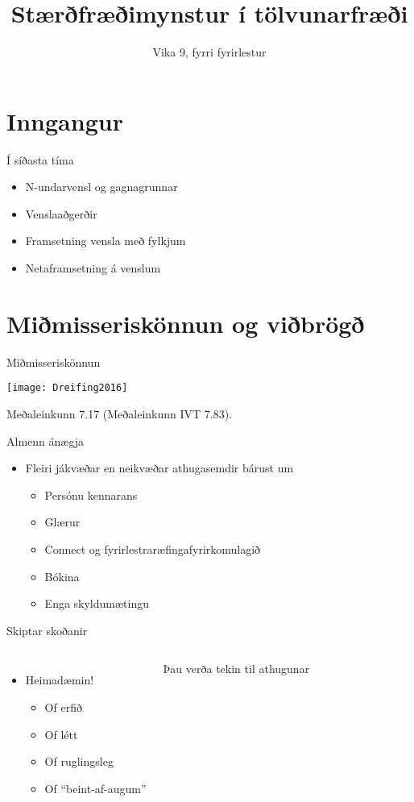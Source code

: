 \documentclass[handout]{beamer}
\title{Stærðfræðimynstur í tölvunarfræði}
\subtitle{Vika 9, fyrri fyrirlestur}
\begin{document}
\begin{frame}
\titlepage
\end{frame}


\section{Inngangur}

\begin{frame}{Í síðasta tíma}
    \begin{itemize}
        \item N-undarvensl og gagnagrunnar
        \item Venslaaðgerðir
        \item Framsetning vensla með fylkjum
        \item Netaframsetning á venslum
    \end{itemize}
\end{frame}

\section{Miðmisseriskönnun og viðbrögð}

\begin{frame}{Miðmisseriskönnun}
\begin{center}
\texttt{[image: Dreifing2016]}
\end{center}
Meðaleinkunn 7.17 (Meðaleinkunn IVT 7.83).
\end{frame}

\begin{frame}{Almenn ánægja}
\begin{itemize}
 \item Fleiri jákvæðar en neikvæðar athugasemdir bárust um
 \begin{itemize}[<+->]
  \item Persónu kennarans
  \item Glærur
  \item Connect og fyrirlestraræfingafyrirkomulagið
  \item Bókina
  \item Enga skyldumætingu
 \end{itemize}
\end{itemize}
\end{frame}

\begin{frame}{Skiptar skoðanir}
\begin{columns}
\begin{itemize}
 \item Heimadæmin!
 \begin{itemize}[<+->]
  \item Of erfið
  \item Of létt
  \item Of ruglingsleg
  \item Of ``beint-af-augum''
 \end{itemize}
\end{itemize}
Þau verða tekin til athugunar
\end{columns}
\end{frame}
\end{document}
